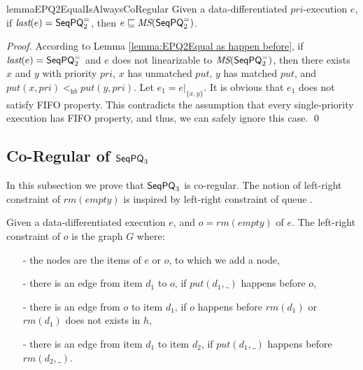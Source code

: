 \begin{restatable}{lemma}{EPQ2EqualIsAlwaysCoRegular}
\label{lemma:EPQ2Equal is always co-regular}
Given a data-differentiated $\textit{pri}$-execution $e$, if $\textit{last}(e) = \mathsf{SeqPQ}_2^{=}$, then $e \sqsubseteq \textit{MS}(\mathsf{SeqPQ}_2^{=})$.
\end{restatable}

\begin {proof}

According to Lemma \ref{lemma:EPQ2Equal as happen before}, if $\textit{last}(e) = \mathsf{SeqPQ}_2^{=}$ and $e$ does not linearizable to $\textit{MS}(\mathsf{SeqPQ}_2^{=})$, then there exists $x$ and $y$ with priority $\textit{pri}$, $x$ has unmatched $\textit{put}$, $y$ has matched $\textit{put}$, and $\textit{put}(x,\textit{pri}) <_{\textit{hb}} \textit{put}(y,\textit{pri})$. Let $e_1 = e \vert_{ \{ x,y \} }$. It is obvious that $e_1$ does not satisfy FIFO property. This contradicts the assumption that every single-priority execution has FIFO property, and thus, we can safely ignore this case. \qed
\end {proof}




\subsection{Co-Regular of $\mathsf{SeqPQ}_3$}
\label{subsec:co-regular of EPQ3}

In this subsection we prove that $\mathsf{SeqPQ}_3$ is co-regular. The notion of left-right constraint of $\textit{rm}(\textit{empty})$ is inspired by left-right constraint of queue \cite{Bouajjani:2015}.

\begin{definition}\label{def:left-right constraint for rmEmpty operation}
Given a data-differentiated execution $e$, and $o = \textit{rm}(\textit{empty})$ of $e$. The left-right constraint of $o$ is the graph $G$ where:

\begin{itemize}
\setlength{\itemsep}{0.5pt}
\item[-] the nodes are the items of $e$ or $o$, to which we add a node,

\item[-] there is an edge from item $d_1$ to $o$, if $\textit{put}(d_1,\_)$ happens before $o$,

\item[-] there is an edge from $o$ to item $d_1$, if $o$ happens before $\textit{rm}(d_1)$ or $\textit{rm}(d_1)$ does not exists in $h$,

\item[-] there is an edge from item $d_1$ to item $d_2$, if $\textit{put}(d_1,\_)$ happens before $\textit{rm}(d_2,\_)$.
\end{itemize}
\end{definition}


